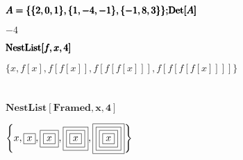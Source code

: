 \documentclass{article}
\begin{document}
\begin{doublespace}
\noindent\(\pmb{\text{}}\\
\pmb{A=\{\{2,0,1\},\{1,-4,-1\},\{-1,8,3\}\};}\\
\pmb{\text{Det}[A]}\)
\end{doublespace}

\begin{doublespace}
\noindent\(-4\)
\end{doublespace}

\begin{doublespace}
\noindent\(\pmb{\text{}}\\
\pmb{\text{NestList}[f,x,4]}\)
\end{doublespace}

\begin{doublespace}
\noindent\(\{x,f[x],f[f[x]],f[f[f[x]]],f[f[f[f[x]]]]\}\)
\end{doublespace}

\begin{doublespace}
\noindent\(\pmb{\text{}}\)
\end{doublespace}

\begin{doublespace}
\noindent\(\pmb{\text{}}\)
\end{doublespace}

\begin{doublespace}
\noindent\(\pmb{\text{NestList}[\text{Framed},x,4]}\)
\end{doublespace}

\begin{doublespace}
\noindent\(\left\{x,\fbox{$x$},\fbox{$\fbox{$x$}$},\fbox{$\fbox{$\fbox{$x$}$}$},\fbox{$\fbox{$\fbox{$\fbox{$x$}$}$}$}\right\}\)
\end{doublespace}
\end{document}
